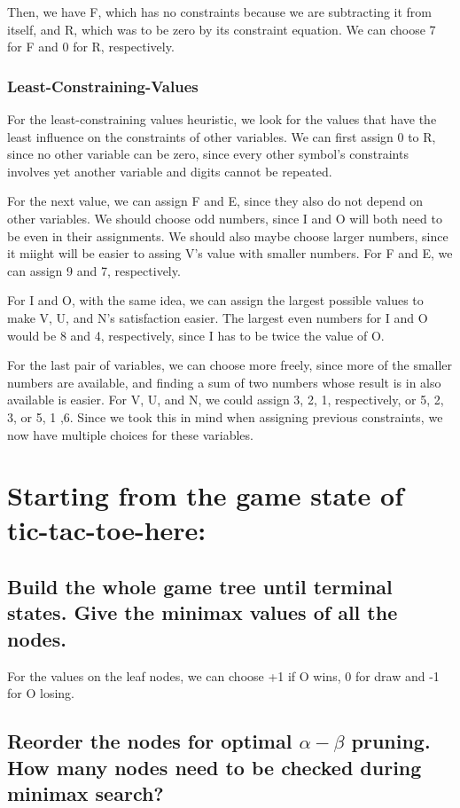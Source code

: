 \documentclass{article}
\begin{document}
		Then, we have F, which has no constraints because we are subtracting it from itself, and R, which was to
		be zero by its constraint equation. We can choose 7 for F and 0 for R, respectively.
		\subsubsection{Least-Constraining-Values}
		For the least-constraining values heuristic, we look for the values that have the least influence 
		on the constraints of other variables. We can first assign 0 to R, since no other variable can 
		be zero, since every other symbol's constraints involves yet another variable and digits cannot
		be repeated.

		For the next value, we can assign F and E, since they also do not depend on other variables. We 
		should choose odd numbers, since I and O will both need to be even in their assignments. We 
		should also maybe choose larger numbers, since it miight will be easier to assing V's value 
		with smaller numbers. For F and E, we can assign 9 and 7, respectively.

		For I and O, with the same idea, we can assign the largest possible values to make V, U, and N's
		satisfaction easier. The largest even numbers for I and O would be 8 and 4, respectively, since I 
		has to be twice the value of O.

		For the last pair of variables, we can choose more freely, since more of the smaller numbers are
		available, and finding a sum of two numbers whose result is in also available is easier. For
		V, U, and N, we could assign 3, 2, 1, respectively, or 5, 2, 3, or 5, 1 ,6. Since we took this 
		in mind when assigning previous constraints, we now have multiple choices for these variables.
\section{Starting from the game state of tic-tac-toe-here:}
	\subsection{Build the whole game tree until terminal states. Give the minimax values of all the nodes.}
		For the values on the leaf nodes, we can choose +1 if O wins, 0 for draw and -1 for O losing.
	\subsection{Reorder the nodes for optimal $\alpha-\beta$ pruning. How many nodes need to be checked 
	during minimax search?}
\end{document}
